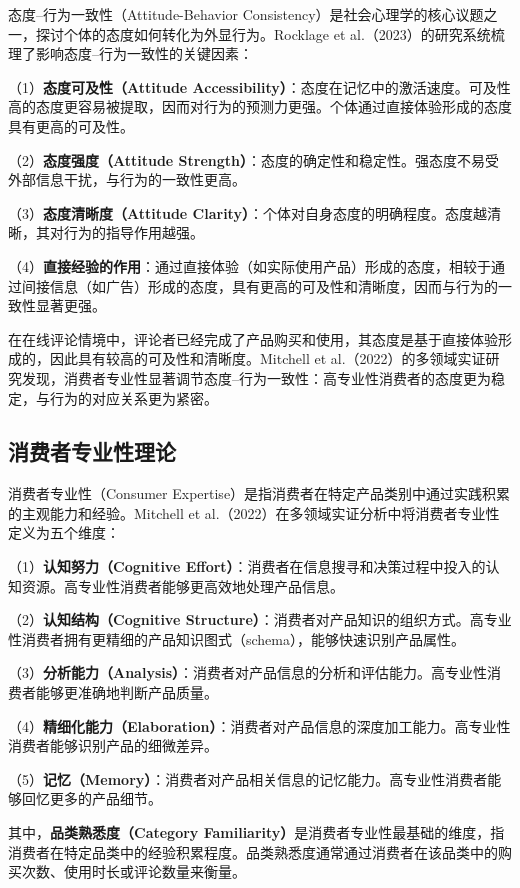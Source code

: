 态度--行为一致性（Attitude-Behavior Consistency）是社会心理学的核心议题之一，探讨个体的态度如何转化为外显行为。Rocklage et al.（2023）\cite{rocklage2023}的研究系统梳理了影响态度--行为一致性的关键因素：

（1）\textbf{态度可及性（Attitude Accessibility）}：态度在记忆中的激活速度。可及性高的态度更容易被提取，因而对行为的预测力更强。个体通过直接体验形成的态度具有更高的可及性。

（2）\textbf{态度强度（Attitude Strength）}：态度的确定性和稳定性。强态度不易受外部信息干扰，与行为的一致性更高。

（3）\textbf{态度清晰度（Attitude Clarity）}：个体对自身态度的明确程度。态度越清晰，其对行为的指导作用越强。

（4）\textbf{直接经验的作用}：通过直接体验（如实际使用产品）形成的态度，相较于通过间接信息（如广告）形成的态度，具有更高的可及性和清晰度，因而与行为的一致性显著更强。

在在线评论情境中，评论者已经完成了产品购买和使用，其态度是基于直接体验形成的，因此具有较高的可及性和清晰度。Mitchell et al.（2022）\cite{mitchell2022}的多领域实证研究发现，消费者专业性显著调节态度--行为一致性：高专业性消费者的态度更为稳定，与行为的对应关系更为紧密。

\subsection{消费者专业性理论}

消费者专业性（Consumer Expertise）是指消费者在特定产品类别中通过实践积累的主观能力和经验。Mitchell et al.（2022）\cite{mitchell2022}在多领域实证分析中将消费者专业性定义为五个维度：

（1）\textbf{认知努力（Cognitive Effort）}：消费者在信息搜寻和决策过程中投入的认知资源。高专业性消费者能够更高效地处理产品信息。

（2）\textbf{认知结构（Cognitive Structure）}：消费者对产品知识的组织方式。高专业性消费者拥有更精细的产品知识图式（schema），能够快速识别产品属性。

（3）\textbf{分析能力（Analysis）}：消费者对产品信息的分析和评估能力。高专业性消费者能够更准确地判断产品质量。

（4）\textbf{精细化能力（Elaboration）}：消费者对产品信息的深度加工能力。高专业性消费者能够识别产品的细微差异。

（5）\textbf{记忆（Memory）}：消费者对产品相关信息的记忆能力。高专业性消费者能够回忆更多的产品细节。

其中，\textbf{品类熟悉度（Category Familiarity）}是消费者专业性最基础的维度，指消费者在特定品类中的经验积累程度。品类熟悉度通常通过消费者在该品类中的购买次数、使用时长或评论数量来衡量。

